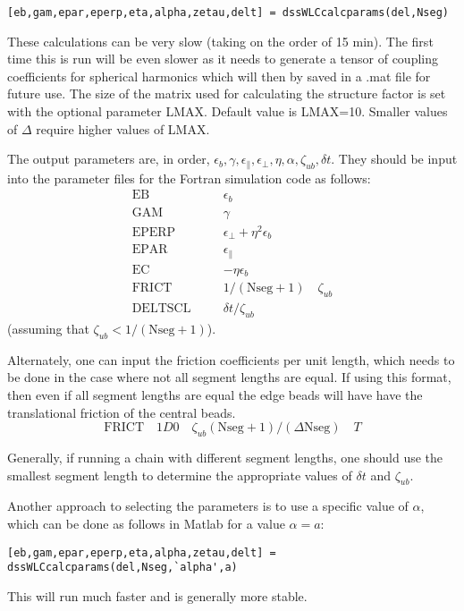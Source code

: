 \documentclass[12pt]{article}
\begin{document}
\begin{verbatim}
[eb,gam,epar,eperp,eta,alpha,zetau,delt] = dssWLCcalcparams(del,Nseg)
\end{verbatim}

These calculations can be very slow (taking on the order of 15 min). The first time this is run will be even slower as it needs to generate a tensor of coupling coefficients for spherical harmonics which will then by saved in a .mat file for future use. The size of the matrix used for calculating the structure factor is set with the optional parameter LMAX. Default value is LMAX=10. Smaller values of $\Delta$ require higher values of LMAX. 

The output parameters are, in order, $\epsilon_b, \gamma, \epsilon_\parallel, \epsilon_\perp, \eta, \alpha, \zeta_{ub}, \delta t$. They should be input into the parameter files for the Fortran simulation code as follows:
\begin{eqnarray*}
\text{EB} & \quad & \epsilon_b \\
\text{GAM} & \quad & \gamma \\
\text{EPERP} & \quad & \epsilon_\perp + \eta^2\epsilon_b \\
\text{EPAR} & \quad & \epsilon_\parallel \\
\text{EC} & \quad & - \eta \epsilon_b \\
\text{FRICT} & \quad & 1/(\text{Nseg}+1) \quad \zeta_{ub} \\
\text{DELTSCL} & \quad & \delta t/\zeta_{ub}
\end{eqnarray*}
(assuming that  $\zeta_{ub} < 1/(\text{Nseg}+1)$). 

Alternately, one can input the friction coefficients per unit length, which needs to be done in the case where not all segment lengths are equal. If using this format, then even if all segment lengths are equal the edge beads will have have the translational friction of the central beads.
\begin{equation*}
\text{FRICT} \quad 1D0 \quad \zeta_{ub}(\text{Nseg}+1)/(\Delta \text{Nseg}) \quad T
\end{equation*}

Generally, if running a chain with different segment lengths, one should use the smallest segment length to determine the appropriate values of $\delta t$ and $\zeta_{ub}$. 

Another approach to selecting the parameters is to use a specific value of $\alpha$, which can be done as follows in Matlab for a value $\alpha=a$:
\begin{verbatim}
[eb,gam,epar,eperp,eta,alpha,zetau,delt] = dssWLCcalcparams(del,Nseg,`alpha',a)
\end{verbatim}
This will run much faster and is generally more stable. 
\end{document}
